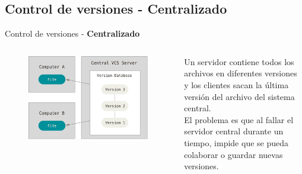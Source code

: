 \documentclass{beamer}
\begin{document}
\subsection{Control de versiones - \textbf{Centralizado}}
\begin{frame}{Control de versiones - \textbf{Centralizado}}
 \begin{columns}
 \begin{figure}
 \centering
 \includegraphics[scale=0.2]{Imagenes/centralized_vcs}
 \end{figure}
 
  \footnotesize
  Un servidor contiene todos los archivos en diferentes versiones y los clientes sacan la última versión del archivo del sistema central. \\
  \footnotesize
   \vspace{2mm}
  El problema es que al fallar el servidor central durante un tiempo, impide que se pueda colaborar o guardar nuevas versiones.
 \end{columns}
\end{frame}
\end{document}
